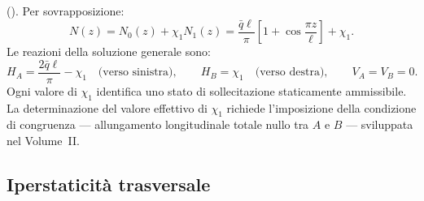 \begin{esempio}
\begin{svolgimento}
		



		
		
		
		().
		Per sovrapposizione:
		\[
		N(z) = N_0(z) + \chi_1 N_1(z)
		= \frac{\bar{q}\ell}{\pi}
		\!\left[1 + \cos\frac{\pi z}{\ell}
		\right] + \chi_1.
		\]
		Le reazioni della soluzione generale sono:
		\[
		H_A = \frac{2\bar{q}\ell}{\pi} - \chi_1
		\quad\text{(verso sinistra)},
		\qquad
		H_B = \chi_1
		\quad\text{(verso destra)},
		\qquad
		V_A = V_B = 0.
		\]
		Ogni valore di $\chi_1$ identifica uno stato
		di sollecitazione staticamente ammissibile.
		La determinazione del valore effettivo di
		$\chi_1$ richiede l'imposizione della
		condizione di congruenza --- allungamento
		longitudinale totale nullo tra $A$ e $B$
		--- sviluppata nel Volume~II.
		



	\end{svolgimento}
\end{esempio}

\subsection{Iperstaticità trasversale}

